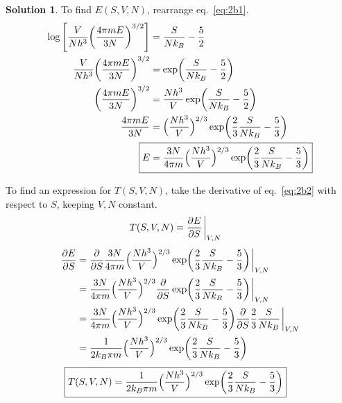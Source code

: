 \documentclass[11pt]{article}
\theoremstyle{definition}
\newtheorem*{solution}{Solution}
\numberwithin{equation}{section}
\numberwithin{figure}{section}
\begin{document}
\begin{solution}
To find $E(S,V,N)$, rearrange eq.~\eqref{eq:2b1}.
\begin{align}
\log\Bigg[\frac{V}{Nh^3}\bigg( \frac{4\pi m E}{3N} \bigg)^{3/2}\Bigg] &= \frac{S}{Nk_B} - \frac{5}{2}
\\
\frac{V}{Nh^3}\bigg( \frac{4\pi m E}{3N} \bigg)^{3/2} &= \exp(\frac{S}{Nk_B} - \frac{5}{2})
\\
\bigg( \frac{4\pi m E}{3N} \bigg)^{3/2} &= \frac{Nh^3}{V} \exp(\frac{S}{Nk_B} - \frac{5}{2})
\\
\frac{4\pi m E}{3N} &= \Big( \frac{Nh^3}{V} \Big) ^{2/3} \exp(\frac{2}{3}\frac{S}{Nk_B} - \frac{5}{3})
\\
\Aboxed{E &= \frac{3N}{4\pi m} \Big( \frac{Nh^3}{V} \Big) ^{2/3} \exp(\frac{2}{3}\frac{S}{Nk_B} - \frac{5}{3})}\label{eq:2b2}
\end{align}

To find an expression for $T(S,V,N)$, take the derivative of eq.~\eqref{eq:2b2} with respect to $S$, keeping $V,N$ constant.
\begin{align}
T(S,V,N) &= \pdv{E}{S}\eval_{V,N}
\end{align}
\begin{align}
\begin{aligned}
\pdv{E}{S} &= \pdv{S} \frac{3N}{4\pi m} \Big( \frac{Nh^3}{V} \Big) ^{2/3} \exp(\frac{2}{3}\frac{S}{Nk_B} - \frac{5}{3}) \eval_{V,N}
\\
&= \frac{3N}{4\pi m} \Big( \frac{Nh^3}{V} \Big) ^{2/3} \pdv{S} \exp(\frac{2}{3}\frac{S}{Nk_B} - \frac{5}{3}) \eval_{V,N}
\\
&= \frac{3N}{4\pi m} \Big( \frac{Nh^3}{V} \Big) ^{2/3} \exp(\frac{2}{3}\frac{S}{Nk_B} - \frac{5}{3}) \pdv{S} \frac{2}{3}\frac{S}{Nk_B} \eval_{V,N}
\\
&= \frac{1}{2k_B\pi m} \Big( \frac{Nh^3}{V} \Big) ^{2/3} \exp(\frac{2}{3}\frac{S}{Nk_B} - \frac{5}{3})
\end{aligned}
\end{align}
\begin{align}
\Aboxed{T(S,V,N) &= \frac{1}{2k_B\pi m} \Big( \frac{Nh^3}{V} \Big) ^{2/3} \exp(\frac{2}{3}\frac{S}{Nk_B} - \frac{5}{3})}\label{eq:2bT}
\end{align}


\end{solution}
\end{document}

